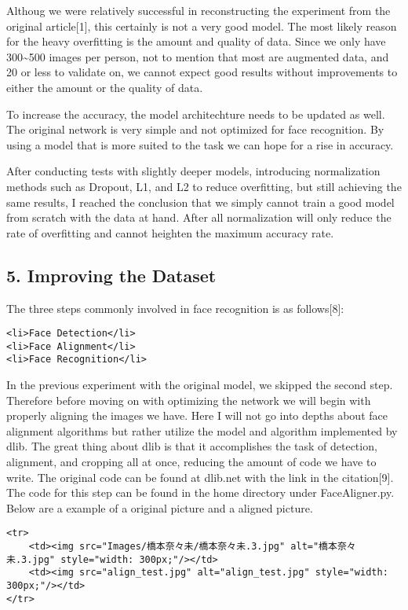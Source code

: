 \documentclass[11pt]{article}
\begin{document}
Althoug we were relatively successful in reconstructing the experiment
from the original article{[}1{]}, this certainly is not a very good
model. The most likely reason for the heavy overfitting is the amount
and quality of data. Since we only have 300\textasciitilde{}500 images
per person, not to mention that most are augmented data, and 20 or less
to validate on, we cannot expect good results without improvements to
either the amount or the quality of data.

To increase the accuracy, the model architechture needs to be updated as
well. The original network is very simple and not optimized for face
recognition. By using a model that is more suited to the task we can
hope for a rise in accuracy.

After conducting tests with slightly deeper models, introducing
normalization methods such as Dropout, L1, and L2 to reduce overfitting,
but still achieving the same results, I reached the conclusion that we
simply cannot train a good model from scratch with the data at hand.
After all normalization will only reduce the rate of overfitting and
cannot heighten the maximum accuracy rate.

    \subsection{5. Improving the Dataset}\label{improving-the-dataset}

    The three steps commonly involved in face recognition is as
follows{[}8{]}:

\begin{verbatim}
<li>Face Detection</li>
<li>Face Alignment</li>
<li>Face Recognition</li>
\end{verbatim}

In the previous experiment with the original model, we skipped the
second step. Therefore before moving on with optimizing the network we
will begin with properly aligning the images we have. Here I will not go
into depths about face alignment algorithms but rather utilize the model
and algorithm implemented by dlib. The great thing about dlib is that it
accomplishes the task of detection, alignment, and cropping all at once,
reducing the amount of code we have to write. The original code can be
found at dlib.net with the link in the citation{[}9{]}. The code for
this step can be found in the home directory under FaceAligner.py. Below
are a example of a original picture and a aligned picture.

\begin{verbatim}
<tr>
    <td><img src="Images/橋本奈々未/橋本奈々未.3.jpg" alt="橋本奈々未.3.jpg" style="width: 300px;"/></td>
    <td><img src="align_test.jpg" alt="align_test.jpg" style="width: 300px;"/></td>
</tr>
\end{verbatim}
\end{document}
